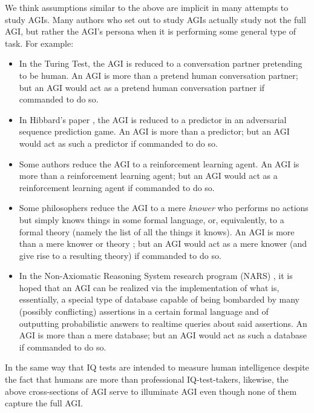 \documentclass{article}
\begin{document}
We think assumptions similar to the above are implicit in many attempts to study AGIs.
Many authors who set out to study
AGIs actually study not the full AGI, but rather the AGI's persona when it is
performing some general type of task. For example:
\begin{itemize}
    \item
    In the Turing Test, the AGI is reduced to a conversation partner pretending to
    be human.
    An AGI is more than a pretend human conversation partner;
    but an AGI would act as a pretend human conversation partner
    if commanded to do so.
    \item
    In Hibbard's paper \cite{hibbard}, the AGI is reduced to a predictor in an
    adversarial sequence prediction game.
    An AGI is more than a predictor; but an AGI would
    act as such a predictor if commanded to do so.
    \item
    Some authors \cite{legg} \cite{hernandez}
    reduce the AGI to a reinforcement learning agent.
    An AGI is more than a reinforcement
    learning agent; but an AGI would
    act as a reinforcement learning agent if commanded to do so.
    \item
    Some philosophers
    reduce the AGI to a mere \emph{knower} who performs
    no actions but simply knows things in some formal language, or, equivalently,
    to a formal theory (namely the list of all the things it knows).
    An AGI is more than a mere knower
    or theory \cite{wang2007three};
    but an AGI would act as a mere knower (and give rise to a resulting theory)
    if commanded to do so.
    \item
    In the Non-Axiomatic Reasoning System research program (NARS) \cite{nars},
    it is hoped that an AGI can be realized via the implementation of what is,
    essentially, a special type of database capable of being bombarded by
    many (possibly conflicting) assertions in a certain formal language
    and of outputting probabilistic answers to realtime queries about said
    assertions. An AGI is more
    than a mere database; but
    an AGI would act as such a database if commanded to do so.
\end{itemize}
In the same way that IQ tests are intended to measure human intelligence despite
the fact that humans are more than professional IQ-test-takers,
likewise, the above cross-sections of AGI serve to illuminate AGI
even though none of them capture the full AGI.
\end{document}

